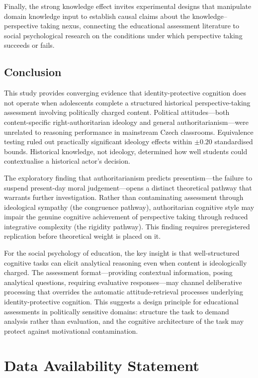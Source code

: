 \documentclass[referee,pdflatex,sn-apa]{sn-jnl}
\begin{document}
Finally, the strong knowledge effect invites experimental designs that manipulate domain knowledge input to establish causal claims about the knowledge--perspective taking nexus, connecting the educational assessment literature to social psychological research on the conditions under which perspective taking succeeds or fails.

\subsection{Conclusion}\label{subsec:conclusion}

This study provides converging evidence that identity-protective cognition does not operate when adolescents complete a structured historical perspective-taking assessment involving politically charged content. Political attitudes---both content-specific right-authoritarian ideology and general authoritarianism---were unrelated to reasoning performance in mainstream Czech classrooms. Equivalence testing ruled out practically significant ideology effects within $\pm 0.20$ standardised bounds. Historical knowledge, not ideology, determined how well students could contextualise a historical actor's decision.

The exploratory finding that authoritarianism predicts presentism---the failure to suspend present-day moral judgement---opens a distinct theoretical pathway that warrants further investigation. Rather than contaminating assessment through ideological sympathy (the congruence pathway), authoritarian cognitive style may impair the genuine cognitive achievement of perspective taking through reduced integrative complexity (the rigidity pathway). This finding requires preregistered replication before theoretical weight is placed on it.

For the social psychology of education, the key insight is that well-structured cognitive tasks can elicit analytical reasoning even when content is ideologically charged. The assessment format---providing contextual information, posing analytical questions, requiring evaluative responses---may channel deliberative processing that overrides the automatic attitude-retrieval processes underlying identity-protective cognition. This suggests a design principle for educational assessments in politically sensitive domains: structure the task to demand analysis rather than evaluation, and the cognitive architecture of the task may protect against motivational contamination.

\section*{Data Availability Statement}
\end{document}
